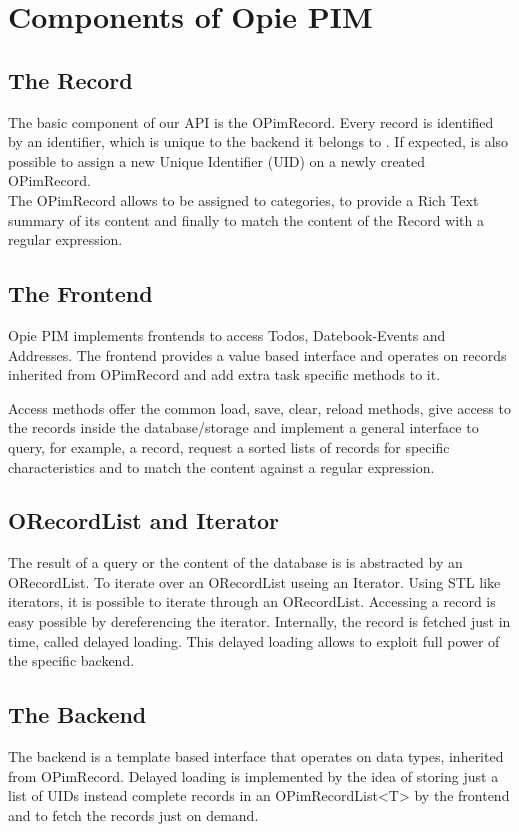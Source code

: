 \section{Components of Opie PIM}

\subsection{The Record}
The basic component of our API is the OPimRecord. Every record is identified
by an identifier, which is unique to the backend it belongs to 
. 
If expected, is also possible to assign a new Unique Identifier (UID) on a newly
created OPimRecord.\\
The OPimRecord allows to be assigned to categories, to provide a Rich Text 
summary of its content and finally to match 
the content of the Record with a regular expression.

\subsection{The Frontend}
Opie PIM implements frontends to access Todos, Datebook-Events and Addresses.
The frontend provides a value based interface and operates on records inherited 
from OPimRecord and add extra task specific methods to it.

Access methods offer the common load, save, clear, reload methods, 
give access to the records inside the database/storage and implement a general
interface to query, for example, a record, request a sorted lists of records for specific
characteristics and to match the content against a regular expression.\\

\subsection{ORecordList and Iterator}
The result of a query or the content of the database is is abstracted by an ORecordList.
To iterate over an ORecordList useing an Iterator. 
Using STL like iterators, it is possible to iterate through an ORecordList.
Accessing a record is easy possible by dereferencing the iterator.
Internally, the record is fetched just in time, called delayed loading. 
This delayed loading allows to exploit  full power of the specific
backend.


\subsection{The Backend}
The backend is a template based interface that operates on data types, inherited from OPimRecord.
Delayed loading is implemented by the idea of storing just a list of UIDs instead complete records 
in an OPimRecordList<T> by the frontend and to fetch the records just on demand.

